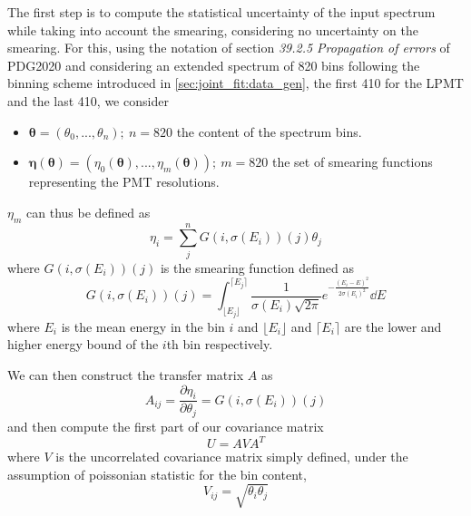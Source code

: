 \documentclass[../main.tex]{subfiles}
\begin{document}
The first step is to compute the statistical uncertainty of the input spectrum while taking into account the smearing, considering no uncertainty on the smearing. For this, using the notation of section \textit{39.2.5 Propagation of errors} of PDG2020 \cite{particle_data_group_review_2020} and considering an extended spectrum of 820 bins following the binning scheme introduced in \ref{sec:joint_fit:data_gen}, the first 410 for the LPMT and the last 410, we consider
\begin{itemize}
  \item $\bm{\theta} = (\theta_0, ..., \theta_n);~ n = 820$ the content of the spectrum bins.
  \item $\bm{\eta}(\bm{\theta}) = (\eta_0(\bm{\theta}), ..., \eta_m(\bm{\theta})); ~ m  = 820$ the set of smearing functions representing the PMT resolutions.
\end{itemize}

$\eta_m$ can thus be defined as
\begin{equation}
  \label{eq:joint_fit:cov_ana:eta}
  \eta_i  = \sum_j^n G(i, \sigma(E_i))(j) \theta_j
\end{equation}
where $G(i, \sigma(E_i))(j)$ is the smearing function defined as
\begin{equation}
  G(i, \sigma(E_i))(j) = \int_{\lfloor E_j\rfloor}^{\lceil E_j \rceil} \frac{1}{\sigma(E_i)\sqrt{2\pi}} e^{-\frac{(E_i-E)^2}{2\sigma(E_i)^2}} \dd{E}
\end{equation}
where $E_i$ is the mean energy in the bin $i$ and $\lfloor E_i\rfloor$ and $\lceil E_i \rceil$ are the lower and higher energy bound of the $i$th bin respectively.

We can then construct the transfer matrix $A$ as
\begin{equation}
  A_{ij} = \frac{\partial\eta_i}{\partial\theta_j} = G(i, \sigma(E_i))(j)
\end{equation}
and then compute the first part of our covariance matrix
\begin{equation}
  U = AVA^T
\end{equation}
where $V$ is the uncorrelated covariance matrix simply defined, under the assumption of poissonian statistic for the bin content,
\begin{equation}
  V_{ij} = \sqrt{\theta_i \theta_j}
\end{equation}
\end{document}
